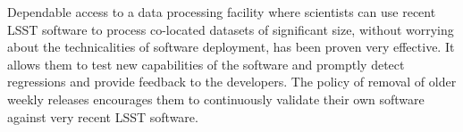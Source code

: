 Dependable access to a data processing facility where scientists can use recent LSST software to process co-located datasets of significant size, without worrying about the technicalities of software deployment, has been proven very effective. It allows them to test new capabilities of the software and promptly detect regressions and provide feedback to the developers. The policy of removal of older weekly releases encourages them to continuously validate their own software against very recent LSST software.
